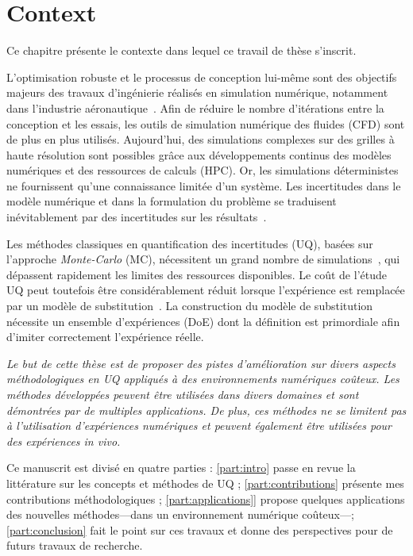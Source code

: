 \chapter{Context}

\begin{chapquote}
Ce chapitre présente le contexte dans lequel ce travail de thèse s'inscrit.

L'optimisation robuste et le processus de conception lui-même sont des objectifs majeurs des travaux d'ingénierie réalisés en simulation numérique, notamment dans l'industrie aéronautique~\cite{duchaine2009}. Afin de réduire le nombre d'itérations entre la conception et les essais, les outils de simulation numérique des fluides (CFD) sont de plus en plus utilisés. Aujourd'hui, des simulations complexes sur des grilles à haute résolution sont possibles grâce aux développements continus des modèles numériques et des ressources de calculs (HPC). Or, les simulations déterministes ne fournissent qu'une connaissance limitée d'un système. Les incertitudes dans le modèle numérique et dans la formulation du problème se traduisent inévitablement par des incertitudes sur les résultats~\cite{Sacks1989}. 

Les méthodes classiques en quantification des incertitudes (UQ), basées sur l'approche \emph{Monte-Carlo} (MC), nécessitent un grand nombre de simulations~\cite{Saltelli2007}, qui dépassent rapidement les limites des ressources disponibles. Le coût de l'étude UQ peut toutefois être considérablement réduit lorsque l'expérience est remplacée par un modèle de substitution~\cite{martin2005}. La construction du modèle de substitution nécessite un ensemble d'expériences (DoE) dont la définition est primordiale afin d'imiter correctement l'expérience réelle.

\emph{
Le but de cette thèse est de proposer des pistes d'amélioration sur divers aspects méthodologiques en UQ appliqués à des environnements numériques coûteux. Les méthodes développées peuvent être utilisées dans divers domaines et sont démontrées par de multiples applications. De plus, ces méthodes ne se limitent pas à l'utilisation d'expériences numériques et peuvent également être utilisées pour des expériences in vivo.    	
}

Ce manuscrit est divisé en quatre parties : \cref{part:intro} passe en revue la littérature sur les concepts et méthodes de UQ ; \cref{part:contributions} présente mes contributions méthodologiques ; \cref{part:applications}] propose quelques applications des nouvelles méthodes---dans un environnement numérique coûteux---; \cref{part:conclusion} fait le point sur ces travaux et donne des perspectives pour de futurs travaux de recherche.
\end{chapquote}


